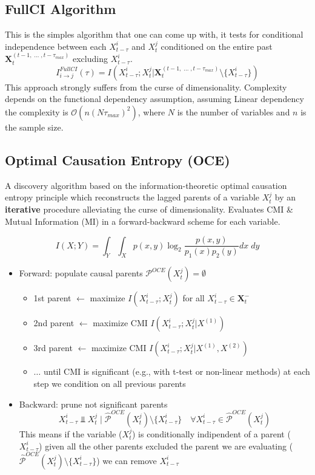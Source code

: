 \subsection{FullCI Algorithm}
This is the simples algorithm that one can come up with, it tests for conditional independence between each
$X^i_{t-\tau}$ and $X^j_t$ conditioned on the entire past $\bm{X}_t^{(t-1,\;\ldots\;, t-\tau_{max})}$ excluding $X^i_{t-\tau}$.
\begin{equation}
    I^{FullCI}_{i\rightarrow j}(\tau)=I(X^i_{t-\tau};X_t^j|\bm{X}_t^{(t-1,\;\ldots\;, t-\tau_{max})}\setminus\{X^i_{t-\tau}\})
\end{equation}
This approach strongly suffers from the curse of dimensionality.
Complexity depends on the functional dependency assumption, assuming Linear dependency the complexity is
$\mathcal{O}(n(N\tau_{max})^2)$, where $N$ is the number of variables and $n$ is the sample size.

\subsection{Optimal Causation Entropy (OCE)}
A discovery algorithm based on the information-theoretic optimal causation entropy principle which reconstructs 
the lagged parents of a variable $X_t^j$ by an \textbf{iterative} procedure alleviating the curse of dimensionality.
Evaluates CMI \& Mutual Information (MI) in a forward-backward scheme for each variable.

\begin{equation}
    I(X;Y)=\int_Y\int_X{p(x,y)\log_2{\frac{p(x, y)}{p_1(x)p_2(y)}}dx\;dy}
\end{equation}
\begin{itemize}
    \item Forward: populate causal parents $\mathcal{P}^{OCE}(X^j_t)=\emptyset$
        \begin{itemize}
            \item 1st parent $\leftarrow$ maximize $I(X^i_{t-\tau};X^j_{t})$ for all $X^i_{t-\tau}\in\bm{X}_t^-$
            \item 2nd parent $\leftarrow$ maximize CMI $I(X^i_{t-\tau};X^j_{t}|X^{(1)})$
            \item 3rd parent $\leftarrow$ maximize CMI $I(X^i_{t-\tau};X^j_{t}|X^{(1)},X^{(2)})$
            \item $\ldots$ until CMI is significant (e.g., with t-test or non-linear methods) at each step we condition on all previous parents
        \end{itemize}
    \item Backward: prune not significant parents
    \begin{equation*}
        X^i_{t-\tau}\Perp X^j_{t} \;|\; \hat{\mathcal{P}}^{OCE}(X^j_t)\setminus\{X^i_{t-\tau}\}\quad
        \forall X^i_{t-\tau}\in\hat{\mathcal{P}}^{OCE}(X^j_t)
    \end{equation*}
    This means if the variable ($X^j_{t}$) is conditionally indipendent of a parent ($X^i_{t-\tau}$) given all the other parents
    excluded the parent we are evaluating ($\hat{\mathcal{P}}^{OCE}(X^j_t)\setminus\{X^i_{t-\tau}\}$) we can remove $X^i_{t-\tau}$
\end{itemize}


